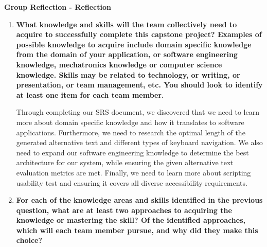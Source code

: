 \textbf{Group Reflection  - Reflection}
\begin{enumerate}

  \item \textbf{What knowledge and skills will the team collectively need to acquire to
  successfully complete this capstone project? Examples of possible knowledge
  to acquire include domain specific knowledge from the domain of your
  application, or software engineering knowledge, mechatronics knowledge or
  computer science knowledge.  Skills may be related to technology, or writing,
  or presentation, or team management, etc.  You should look to identify at
  least one item for each team member. }\newline

  Through completing our SRS document, we discovered that we need to learn more about domain 
  specific knowledge and how it translates to software applications. Furthermore, we 
  need to research the optimal length of the generated alternative text and different types of keyboard navigation. 
  We also need to expand our software engineering knowledge to determine the best architecture for our system, while ensuring 
  the given alternative text evaluation metrics are met. Finally, we need to learn more about scripting usability test and ensuring
  it covers all diverse accessibility requirements. 
  
  \item \textbf{For each of the knowledge areas and skills identified in the previous
  question, what are at least two approaches to acquiring the knowledge or
  mastering the skill?  Of the identified approaches, which will each team
  member pursue, and why did they make this choice?} \newline


\end{enumerate}
